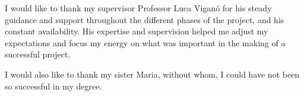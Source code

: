 I would like to thank my supervisor Professor Luca Viganó for his steady guidance and support throughout the different phases of the project, and his constant availability.
His expertise and supervision helped me adjust my expectations and focus my energy on what was important in the making of a successful project.\newline

I would also like to thank my sister Maria, without whom, I could have not been so successful in my degree.
